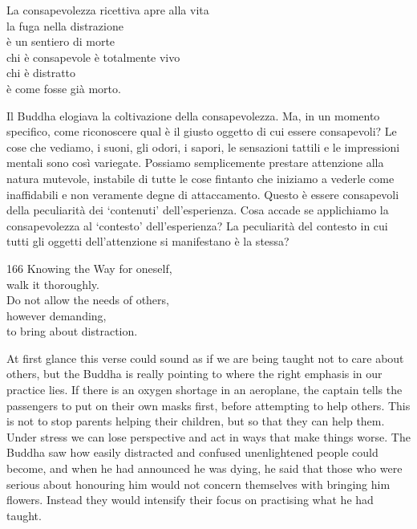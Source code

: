 

\begin{dhpVerse}{21}
\label{dhp-21}
La consapevolezza ricettiva apre alla vita\\
la fuga nella distrazione\\
è un sentiero di morte\\
chi è consapevole è totalmente vivo\\
chi è distratto\\
è come fosse già morto.
\end{dhpVerse}

\begin{dhpRefl}
  Il Buddha elogiava la coltivazione della consapevolezza. Ma, in un momento
  specifico, come riconoscere qual è il giusto oggetto di cui essere
  consapevoli? Le cose che vediamo, i suoni, gli odori, i sapori, le sensazioni
  tattili e le impressioni mentali sono così variegate. Possiamo semplicemente
  prestare attenzione alla natura mutevole, instabile di tutte le cose fintanto
  che iniziamo a vederle come inaffidabili e non veramente degne di
  attaccamento. Questo è essere consapevoli della peculiarità dei `contenuti'
  dell'esperienza. Cosa accade se applichiamo la consapevolezza al `contesto'
  dell'esperienza? La peculiarità del contesto in cui tutti gli oggetti
  dell'attenzione si manifestano è la stessa?
\end{dhpRefl}



\begin{dhpVerse}{166}
\label{dhp-166}
Knowing the Way for oneself,\\
walk it thoroughly.\\
Do not allow the needs of others,\\
however demanding,\\
to bring about distraction.
\end{dhpVerse}

\begin{dhpRefl}
  At first glance this verse could sound as if we are being taught not to care
  about others, but the Buddha is really pointing to where the right emphasis in
  our practice lies. If there is an oxygen shortage in an aeroplane, the captain
  tells the passengers to put on their own masks first, before attempting to
  help others. This is not to stop parents helping their children, but so that
  they can help them. Under stress we can lose perspective and act in ways that
  make things worse. The Buddha saw how easily distracted and confused
  unenlightened people could become, and when he had announced he was dying, he
  said that those who were serious about honouring him would not concern
  themselves with bringing him flowers. Instead they would intensify their focus
  on practising what he had taught.
\end{dhpRefl}

